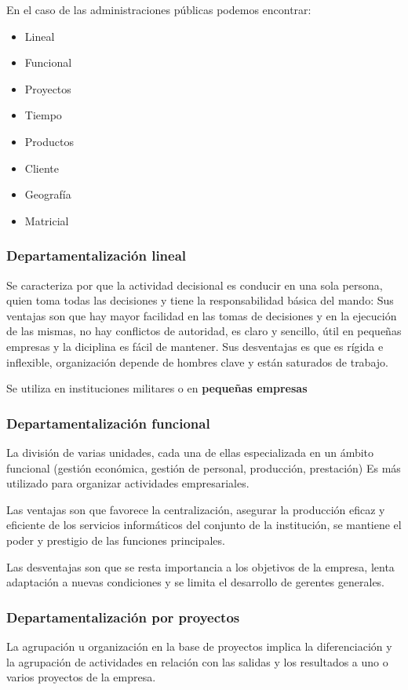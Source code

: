 En el caso de las administraciones públicas podemos encontrar:
\begin{itemize}
    \item Lineal
    \item Funcional
    \item Proyectos
    \item Tiempo
    \item Productos
    \item Cliente
    \item Geografía
    \item Matricial
\end{itemize}

\subsubsection{Departamentalización lineal}
Se caracteriza por que la actividad decisional es conducir en una sola persona, quien toma todas las decisiones y tiene la responsabilidad básica del mando:
Sus ventajas son que hay mayor facilidad en las tomas de decisiones y en la ejecución de las mismas, no hay conflictos de autoridad, es claro y sencillo, útil en pequeñas empresas y la diciplina es fácil de mantener.
Sus desventajas es que es rígida e inflexible, organización depende de hombres clave y están saturados de trabajo.

Se utiliza en instituciones militares o en \textbf{pequeñas empresas}

\subsubsection{Departamentalización funcional}
La división de varias unidades, cada una de ellas especializada en un ámbito funcional (gestión económica, gestión de personal, producción, prestación)
Es más utilizado para organizar actividades empresariales.

Las ventajas son que favorece la centralización, asegurar la producción eficaz y eficiente de los servicios informáticos del conjunto de la institución, se mantiene el poder y prestigio de las funciones principales.

Las desventajas son que se resta importancia a los objetivos de la empresa, lenta adaptación a nuevas condiciones y se limita el desarrollo de gerentes generales.

\subsubsection{Departamentalización por proyectos}
La agrupación u organización en la base de proyectos implica la diferenciación y la agrupación de actividades en relación con las salidas y los resultados a uno o varios proyectos de la empresa.

